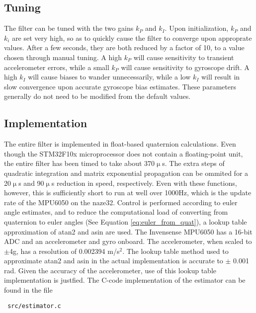 \documentclass[paper=a4, fontsize=11pt]{scrartcl} %
\numberwithin{equation}{section} %
\numberwithin{figure}{section} %
\numberwithin{table}{section} %
\begin{document}
\subsection{Tuning}
The filter can be tuned with the two gains $k_P$ and $k_I$.  Upon initialization, $k_P$ and $k_i$ are set very high, so as to quickly cause the filter to converge upon approprate values.  After a few seconds, they are both reduced by a factor of 10, to a value chosen through manual tuning.  A high $k_P$ will cause sensitivity to transient accelerometer errors, while a small $k_P$ will cause sensitivity to gyroscope drift.  A high $k_I$ will cause biases to wander unnecessarily, while a low $k_I$ will result in slow convergence upon accurate gyroscope bias estimates.  These parameters generally do not need to be modified from the default values.

\subsection{Implementation}
The entire filter is implemented in float-based quaternion calculations.  Even though the STM32F10x microprocessor does not contain a floating-point unit, the entire filter has been timed to take about 370$\upmu$s.  The extra steps of quadratic integration and matrix exponential propagation can be ommited for a 20$\upmu$s and 90$\upmu$s reduction in speed, respectively.  Even with these functions, however, this is sufficiently short to run at well over 1000Hz, which is the update rate of the MPU6050 on the naze32.
Control is performed according to euler angle estimates, and to reduce the computational load of converting from quaternion to euler angles (See Equation \ref{eq:euler_from_quat}), a lookup table approximation of atan2 and asin are used.  The Invensense MPU6050 has a 16-bit ADC and an accelerometer and gyro onboard.  The accelerometer, when scaled to $\pm$4g, has a resolution of 0.002394 m/s$^2$.  The lookup table method used to approximate atan2 and asin in the actual implementation is accurate to $\pm$ 0.001 rad.  Given the accuracy of the accelerometer, use of this lookup table implementation is justfied.  The C-code implementation of the estimator can be found in the file \begin{verbatim} src/estimator.c \end{verbatim}



\end{document}
